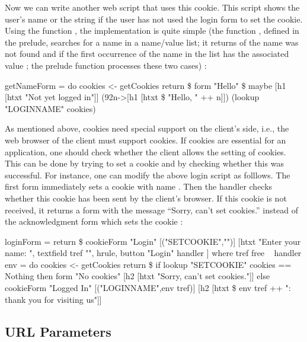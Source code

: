 Now we can write another web script that uses this cookie.
This script shows the user's name or the string
 if the user has not used the
login form to set the cookie.
Using the function , the implementation
is quite simple (the function , defined in the
prelude, searches for a name in a name/value list;
it returns  of the name was not found and
 if the first occurrence of the name in the list
has the associated value ; the prelude function
 processes these two cases)
:
\begin{prog}
getNameForm =
   do cookies <- getCookies
      return \$ form "Hello" \$
       maybe [h1 [htxt "Not yet logged in"]]
             (\char92n->[h1 [htxt \$ "Hello, " ++ n]])
             (lookup "LOGINNAME" cookies)
\end{prog}
%
As mentioned above, cookies need special support on the client's
side, i.e., the web browser of the client must support cookies.
If cookies are essential for an application, one should check
whether the client allows the setting of cookies.
This can be done by trying to set a cookie and by checking
whether this was successful. For instance, one can modify
the above login script as folllows.
The first form immediately sets a cookie with name .
Then the handler checks whether this cookie has been sent by the
client's browser. If this cookie is not received, it returns a form
with the message ``Sorry, can't set cookies.'' instead of the
acknowledgment form which sets the cookie 
:
\begin{prog}
loginForm = return \$ cookieForm "Login" [("SETCOOKIE","")]
      [htxt "Enter your name: ", textfield tref "", hrule,
       button "Login" handler
      ]
 where
   tref free
~
   handler env = do
     cookies <- getCookies
     return \$
       if lookup "SETCOOKIE" cookies == Nothing
       then form "No cookies" [h2 [htxt "Sorry, can't set cookies."]]
       else cookieForm "Logged In" [("LOGINNAME",env tref)]
                       [h2 [htxt \$ env tref ++ ": thank you for visiting us"]]
\end{prog}


\subsection{URL Parameters}

